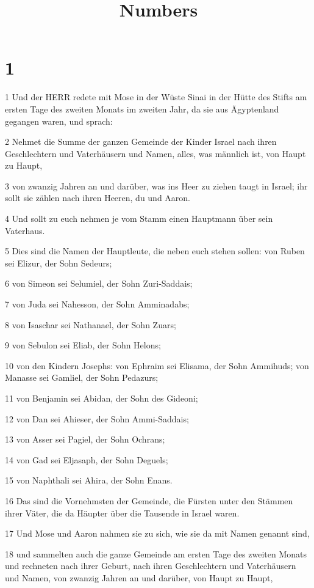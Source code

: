 

\title{Numbers}


\chapter{1}

\par 1 Und der HERR redete mit Mose in der Wüste Sinai in der Hütte des Stifts am ersten Tage des zweiten Monats im zweiten Jahr, da sie aus Ägyptenland gegangen waren, und sprach:
\par 2 Nehmet die Summe der ganzen Gemeinde der Kinder Israel nach ihren Geschlechtern und Vaterhäusern und Namen, alles, was männlich ist, von Haupt zu Haupt,
\par 3 von zwanzig Jahren an und darüber, was ins Heer zu ziehen taugt in Israel; ihr sollt sie zählen nach ihren Heeren, du und Aaron.
\par 4 Und sollt zu euch nehmen je vom Stamm einen Hauptmann über sein Vaterhaus.
\par 5 Dies sind die Namen der Hauptleute, die neben euch stehen sollen: von Ruben sei Elizur, der Sohn Sedeurs;
\par 6 von Simeon sei Selumiel, der Sohn Zuri-Saddais;
\par 7 von Juda sei Nahesson, der Sohn Amminadabs;
\par 8 von Isaschar sei Nathanael, der Sohn Zuars;
\par 9 von Sebulon sei Eliab, der Sohn Helons;
\par 10 von den Kindern Josephs: von Ephraim sei Elisama, der Sohn Ammihuds; von Manasse sei Gamliel, der Sohn Pedazurs;
\par 11 von Benjamin sei Abidan, der Sohn des Gideoni;
\par 12 von Dan sei Ahieser, der Sohn Ammi-Saddais;
\par 13 von Asser sei Pagiel, der Sohn Ochrans;
\par 14 von Gad sei Eljasaph, der Sohn Deguels;
\par 15 von Naphthali sei Ahira, der Sohn Enans.
\par 16 Das sind die Vornehmsten der Gemeinde, die Fürsten unter den Stämmen ihrer Väter, die da Häupter über die Tausende in Israel waren.
\par 17 Und Mose und Aaron nahmen sie zu sich, wie sie da mit Namen genannt sind,
\par 18 und sammelten auch die ganze Gemeinde am ersten Tage des zweiten Monats und rechneten nach ihrer Geburt, nach ihren Geschlechtern und Vaterhäusern und Namen, von zwanzig Jahren an und darüber, von Haupt zu Haupt,
